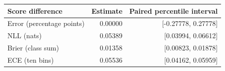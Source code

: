 \begin{tabular}{lrr}\toprule
Score difference & Estimate & Paired percentile interval \\\midrule
Error (percentage points) & 0.00000 & [-0.27778, 0.27778]\\
NLL (nats) & 0.05389 & [0.03994, 0.06612]\\
Brier (class sum) & 0.01358 & [0.00823, 0.01878]\\
ECE (ten bins) & 0.05536 & [0.04162, 0.05959]\\
\bottomrule\end{tabular}